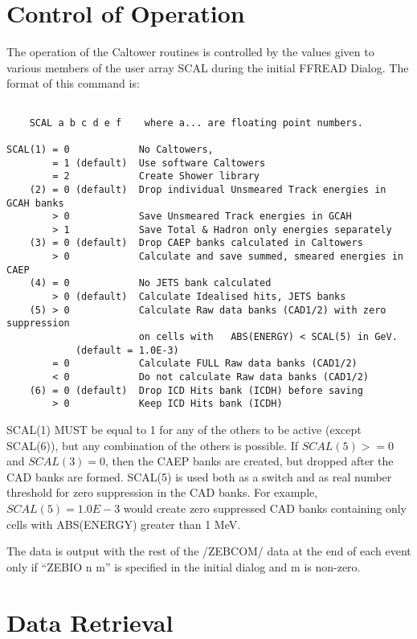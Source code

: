 \section{Control of Operation}

The operation of the Caltower routines is controlled by the values given to
various members of the user array SCAL during the initial FFREAD Dialog. The
format of this command is:

\begin{verbatim}

    SCAL a b c d e f    where a... are floating point numbers.

SCAL(1) = 0            No Caltowers,
        = 1 (default)  Use software Caltowers
        = 2            Create Shower library
    (2) = 0 (default)  Drop individual Unsmeared Track energies in GCAH banks
        > 0            Save Unsmeared Track energies in GCAH
        > 1            Save Total & Hadron only energies separately
    (3) = 0 (default)  Drop CAEP banks calculated in Caltowers
        > 0            Calculate and save summed, smeared energies in CAEP
    (4) = 0            No JETS bank calculated
        > 0 (default)  Calculate Idealised hits, JETS banks
    (5) > 0            Calculate Raw data banks (CAD1/2) with zero suppression
                       on cells with   ABS(ENERGY) < SCAL(5) in GeV.
            (default = 1.0E-3)
        = 0            Calculate FULL Raw data banks (CAD1/2)
        < 0            Do not calculate Raw data banks (CAD1/2)
    (6) = 0 (default)  Drop ICD Hits bank (ICDH) before saving
        > 0            Keep ICD Hits bank (ICDH)
\end{verbatim}

SCAL(1) MUST be equal to 1 for any of the others to be active (except SCAL(6)),
but any combination of the others is possible. If $SCAL(5)>=0$ and $SCAL(3)=0$,
then the CAEP banks are created, but dropped after the CAD banks are formed.
SCAL(5) is used both as a switch and as real number threshold for zero
suppression in the CAD banks. For example, $SCAL(5)=1.0E-3$ would create zero
suppressed CAD banks containing only cells with ABS(ENERGY) greater than 1 MeV.

The data is output with the rest of the /ZEBCOM/ data at the end of
each event only if ``ZEBIO n m'' is specified in the initial dialog and m is
non-zero.

\section{Data Retrieval}

